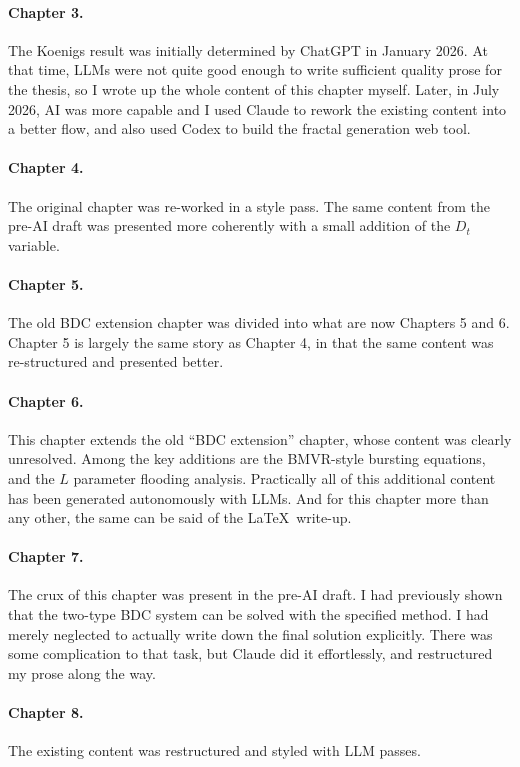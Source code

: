 \paragraph{Chapter 3.}
The Koenigs result was initially determined by ChatGPT in January 2026. At that time, LLMs were not quite good enough to write sufficient quality prose for the thesis, so I wrote up the whole content of this chapter myself. Later, in July 2026, AI was more capable and I used Claude to rework the existing content into a better flow, and also used Codex to build the fractal generation web tool.

\paragraph{Chapter 4.}
The original chapter was re-worked in a style pass. The same content from the pre-AI draft was presented more coherently with a small addition of the $D_t$ variable.

\paragraph{Chapter 5.}
The old BDC extension chapter was divided into what are now Chapters 5 and 6. Chapter 5 is largely the same story as Chapter 4, in that the same content was re-structured and presented better.

\paragraph{Chapter 6.}
This chapter extends the old ``BDC extension'' chapter, whose content was clearly unresolved. Among the key additions are the BMVR-style bursting equations, and the $L$ parameter flooding analysis. Practically all of this additional content has been generated autonomously with LLMs. And for this chapter more than any other, the same can be said of the \LaTeX\ write-up.

\paragraph{Chapter 7.}
The crux of this chapter was present in the pre-AI draft. I had previously shown that the two-type BDC system can be solved with the specified method. I had merely neglected to actually write down the final solution explicitly. There was some complication to that task, but Claude did it effortlessly, and restructured my prose along the way.

\paragraph{Chapter 8.}
The existing content was restructured and styled with LLM passes.


